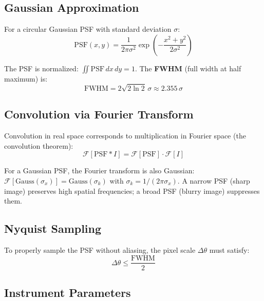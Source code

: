 \documentclass[11pt, letterpaper]{article}
\begin{document}
\subsection{Gaussian Approximation}

For a circular Gaussian PSF with standard deviation $\sigma$:
\begin{equation}
\mathrm{PSF}(x, y) = \frac{1}{2\pi\sigma^2}
\exp\!\left(-\frac{x^2 + y^2}{2\sigma^2}\right)
\label{eq:gaussian-psf}
\end{equation}

The PSF is normalized: $\iint \mathrm{PSF}\,dx\,dy = 1$. The
\textbf{FWHM} (full width at half maximum) is:
\begin{equation}
\mathrm{FWHM} = 2\sqrt{2\ln 2}\,\sigma \approx 2.355\,\sigma
\label{eq:fwhm}
\end{equation}

\subsection{Convolution via Fourier Transform}

Convolution in real space corresponds to multiplication in Fourier space
(the convolution theorem):
\begin{equation}
\mathcal{F}[\mathrm{PSF} \ast I] = \mathcal{F}[\mathrm{PSF}] \cdot \mathcal{F}[I]
\label{eq:convolution-theorem}
\end{equation}

For a Gaussian PSF, the Fourier transform is also Gaussian:
$\mathcal{F}[\mathrm{Gauss}(\sigma_x)] = \mathrm{Gauss}(\sigma_k)$ with
$\sigma_k = 1/(2\pi\sigma_x)$. A narrow PSF (sharp image) preserves
high spatial frequencies; a broad PSF (blurry image) suppresses them.

\subsection{Nyquist Sampling}

To properly sample the PSF without aliasing, the pixel scale $\Delta\theta$
must satisfy:
\begin{equation}
\Delta\theta \leq \frac{\mathrm{FWHM}}{2}
\label{eq:nyquist}
\end{equation}

\subsection{Instrument Parameters}
\end{document}
